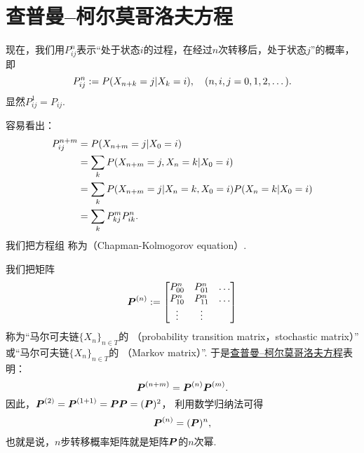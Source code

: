 \section{查普曼--柯尔莫哥洛夫方程}
现在，我们用\(P^n_{ij}\)表示“处于状态\(i\)的过程，在经过\(n\)次转移后，处于状态\(j\)”的概率，
即\begin{equation*}
	P^n_{ij}
	:=
	P(
		X_{n+k} = j
		\vert
		X_k = i
	),
	\quad(n,i,j=0,1,2,\dotsc).
\end{equation*}
显然\(P^1_{ij} = P_{ij}\).

容易看出：\begin{align}
	P^{n+m}_{ij}
	&= P(X_{n+m} = j \vert X_0 = i) \notag\\
	&= \sum_k P(X_{n+m} = j, X_n = k \vert X_0 = i) \notag\\
	&= \sum_k P(X_{n+m} = j \vert X_n = k, X_0 = i) P(X_n = k \vert X_0 = i) \notag\\
	&= \sum_k P^m_{kj} P^n_{ik}.
		\label{equation:马尔可夫链.CK方程}
\end{align}
我们把方程组 
称为（Chapman-Kolmogorov equation）.

我们把矩阵\begin{equation*}
	\boldsymbol{P}^{(n)}
	:= \begin{bmatrix}
		P^n_{00} & P^n_{01} & \dots \\
		P^n_{10} & P^n_{11} & \dots \\
		\vdots & \vdots & \\
	\end{bmatrix}
\end{equation*}
称为“马尔可夫链\(\{X_n\}_{n \in T}\)的 （probability transition matrix，stochastic matrix）”
或“马尔可夫链\(\{X_n\}_{n \in T}\)的 （Markov matrix）”.
于是\hyperref[equation:马尔可夫链.CK方程]{查普曼--柯尔莫哥洛夫方程}表明：\begin{equation}
	\boldsymbol{P}^{(n+m)}
	= \boldsymbol{P}^{(n)} \boldsymbol{P}^{(m)}.
\end{equation}
因此，\(
	\boldsymbol{P}^{(2)}
	= \boldsymbol{P}^{(1+1)}
	= \boldsymbol{P} \boldsymbol{P}
	= (\boldsymbol{P})^2
\)，
利用数学归纳法可得\begin{equation}
	\boldsymbol{P}^{(n)}
	= (\boldsymbol{P})^n,
\end{equation}
也就是说，\(n\)步转移概率矩阵就是矩阵\(\boldsymbol{P}\)的\(n\)次幂.

